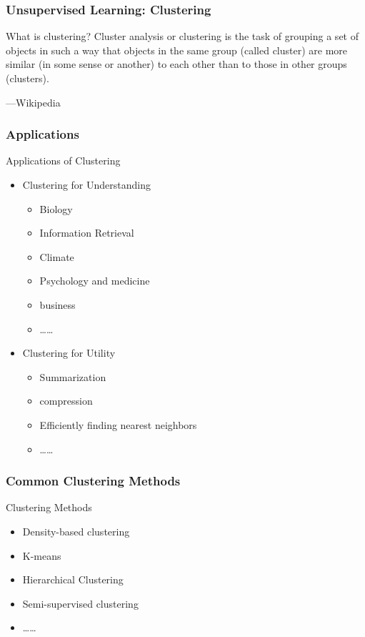 \documentclass[UTF8]{beamer}\usepackage[]{graphicx}\usepackage[]{color}
\begin{document}
\begin{frame}[fragile]
  \frametitle{Unsupervised Learning: Clustering}
\begin{block}{What is clustering?}
Cluster analysis or clustering is the task of grouping a set of objects in such a way that objects in the same group (called cluster) are more similar (in some sense or another) to each other than to those in other groups (clusters).

---Wikipedia
\end{block}
\end{frame}

\begin{frame}
\frametitle{Applications}
\begin{block}{Applications of Clustering}
\begin{itemize}
	\item Clustering for Understanding
		\begin{itemize}
			\item Biology
			\item Information Retrieval
			\item Climate
			\item Psychology and medicine
			\item business
			\item \ldots \ldots
		\end{itemize}
	\item Clustering for Utility
		\begin{itemize}
			\item Summarization
			\item compression
			\item Efficiently finding nearest neighbors
			\item \ldots \ldots
		\end{itemize}
\end{itemize}
\end{block}
\end{frame}

\begin{frame}[fragile]
  \frametitle{Common Clustering Methods}
\begin{block}{Clustering Methods}
  \begin{itemize}
  \item Density-based clustering
  \item K-means
  \item Hierarchical Clustering
  \item Semi-supervised clustering
  \item \ldots \ldots
  \end{itemize}
\end{block}
\end{frame}
\end{document}
